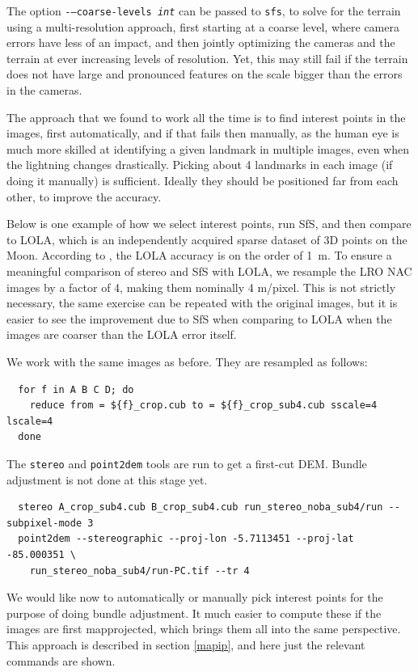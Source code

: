 The option \texttt{-\/--coarse-levels \it{int}} can be passed to
\texttt{sfs}, to solve for the terrain using a multi-resolution
approach, first starting at a coarse level, where camera errors have
less of an impact, and then jointly optimizing the cameras and
the terrain at ever increasing levels of resolution. Yet, this may still
fail if the terrain does not have large and pronounced features on the
scale bigger than the errors in the cameras.

The approach that we found to work all the time is to find interest points
in the images, first automatically, and if that fails then manually, as
the human eye is much more skilled at identifying a given landmark in
multiple images, even when the lightning changes drastically. Picking
about 4 landmarks in each image (if doing it manually) is
sufficient. Ideally they should be positioned far from each other, to
improve the accuracy.

Below is one example of how we select interest points, run SfS,
and then compare to LOLA, which is an independently acquired
sparse dataset of 3D points on the Moon. According to
\cite{smith2011results}, the LOLA accuracy is on the order of 1~m. To
ensure a meaningful comparison of stereo and SfS with LOLA, we resample
the LRO NAC images by a factor of 4, making them nominally 4
m/pixel. This is not strictly necessary, the same exercise can be
repeated with the original images, but it is easier to see the
improvement due to SfS when comparing to LOLA when the images are
coarser than the LOLA error itself.

We work with the same images as before. They are resampled as follows:
\begin{verbatim}
  for f in A B C D; do 
    reduce from = ${f}_crop.cub to = ${f}_crop_sub4.cub sscale=4 lscale=4
  done
\end{verbatim}

The \texttt{stereo} and \texttt{point2dem} tools are run to get a first-cut DEM. Bundle adjustment is not done at this stage yet. 
\begin{verbatim}
  stereo A_crop_sub4.cub B_crop_sub4.cub run_stereo_noba_sub4/run --subpixel-mode 3
  point2dem --stereographic --proj-lon -5.7113451 --proj-lat -85.000351 \
    run_stereo_noba_sub4/run-PC.tif --tr 4 
\end{verbatim}

We would like now to automatically or manually pick interest points for
the purpose of doing bundle adjustment. It much easier to compute these
if the images are first mapprojected, which brings them all into the
same perspective. This approach is described in section \ref{mapip}, and
here just the relevant commands are shown.

